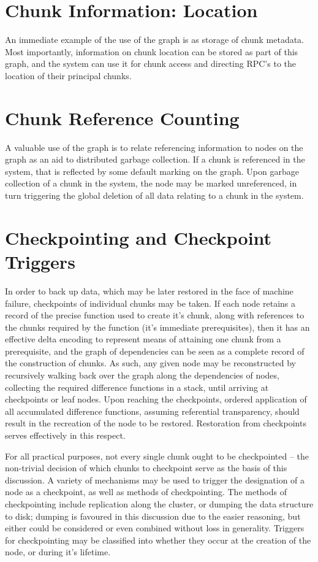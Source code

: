 \documentclass[10pt, a4paper]{article}
\begin{document}
\section{Chunk Information: Location}

An immediate example of the use of the graph is as storage of chunk metadata.
Most importantly, information on chunk location can be stored as part of this graph, and the system can use it for chunk access and directing RPC's to the location of their principal chunks.

\section{Chunk Reference Counting}

A valuable use of the graph is to relate referencing information to nodes on the graph as an aid to distributed garbage collection.
If a chunk is referenced in the system, that is reflected by some default marking on the graph.
Upon garbage collection of a chunk in the system, the node may be marked unreferenced, in turn triggering the global deletion of all data relating to a chunk in the system.

\section{Checkpointing and Checkpoint Triggers}

In order to back up data, which may be later restored in the face of machine failure, checkpoints of individual chunks may be taken.
If each node retains a record of the precise function used to create it's chunk, along with references to the chunks required by the function (it's immediate prerequisites), then it has an effective delta encoding to represent means of attaining one chunk from a prerequisite, and the graph of dependencies can be seen as a complete record of the construction of chunks.
As such, any given node may be reconstructed by recursively walking back over the graph along the dependencies of nodes, collecting the required difference functions in a stack, until arriving at checkpoints or leaf nodes.
Upon reaching the checkpoints, ordered application of all accumulated difference functions, assuming referential transparency, should result in the recreation of the node to be restored.
Restoration from checkpoints serves effectively in this respect.

For all practical purposes, not every single chunk ought to be checkpointed -- the non-trivial decision of which chunks to checkpoint serve as the basis of this discussion.
A variety of mechanisms may be used to trigger the designation of a node as a checkpoint, as well as methods of checkpointing.
The methods of checkpointing include replication along the cluster, or dumping the data structure to disk; dumping is favoured in this discussion due to the easier reasoning, but either could be considered or even combined without loss in generality.
Triggers for checkpointing may be classified into whether they occur at the creation of the node, or during it's lifetime.
\end{document}
